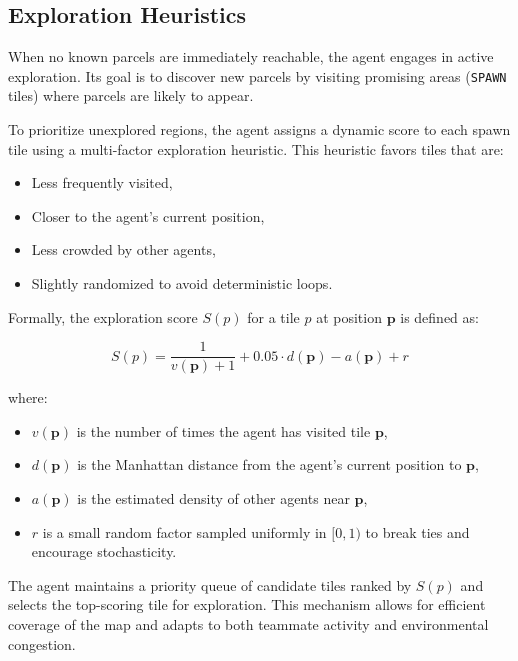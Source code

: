 \documentclass[conference]{IEEEtran}
\begin{document}
\subsection{Exploration Heuristics}

When no known parcels are immediately reachable, the agent engages in active exploration. Its goal is to discover new parcels by visiting promising areas (\texttt{SPAWN} tiles) where parcels are likely to appear.

To prioritize unexplored regions, the agent assigns a dynamic score to each spawn tile using a multi-factor exploration heuristic. This heuristic favors tiles that are:

\begin{itemize}
	\item Less frequently visited,
	\item Closer to the agent's current position,
	\item Less crowded by other agents,
	\item Slightly randomized to avoid deterministic loops.
\end{itemize}

Formally, the exploration score $S(p)$ for a tile $p$ at position $\mathbf{p}$ is defined as:

\[
S(p) = \frac{1}{v(\mathbf{p}) + 1} + 0.05 \cdot d(\mathbf{p}) - a(\mathbf{p}) + r
\]

where:
\begin{itemize}
	\item $v(\mathbf{p})$ is the number of times the agent has visited tile $\mathbf{p}$,
	\item $d(\mathbf{p})$ is the Manhattan distance from the agent’s current position to $\mathbf{p}$,
	\item $a(\mathbf{p})$ is the estimated density of other agents near $\mathbf{p}$,
	\item $r$ is a small random factor sampled uniformly in $[0, 1)$ to break ties and encourage stochasticity.
\end{itemize}

The agent maintains a priority queue of candidate tiles ranked by $S(p)$ and selects the top-scoring tile for exploration. This mechanism allows for efficient coverage of the map and adapts to both teammate activity and environmental congestion.













\end{document}
